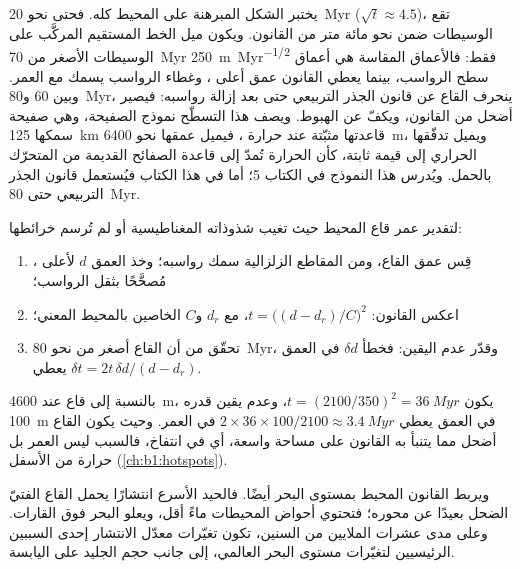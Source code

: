 يختبر الشكل المبرهنة على المحيط كله. فحتى نحو \qty{20}{Myr} ($\sqrt t \approx 4.5$)، تقع الوسيطات ضمن نحو مائة متر من القانون. ويكون ميل الخط المستقيم المركَّب على الوسيطات الأصغر من \qty{70}{Myr} \qty{250}{m.Myr^{-1/2}} فقط: فالأعماق المقاسة هي أعماق سطح الرواسب، بينما يعطي القانون عمق أعلى ، وغطاء الرواسب يسمك مع العمر. وبين 60 و\qty{80}{Myr}، ينحرف القاع عن قانون الجذر التربيعي حتى بعد إزالة رواسبه: فيصير أضحل من القانون، ويكفّ عن الهبوط. ويصف هذا التسطّح نموذج الصفيحة، وهي صفيحة سمكها \qty{125}{km} قاعدتها مثبّتة عند حرارة ، فيميل عمقها نحو \qty{6400}{m}، ويميل تدفّقها الحراري إلى قيمة ثابتة، كأن الحرارة تُمدّ إلى قاعدة الصفائح القديمة من  المتحرّك بالحمل. ويُدرس هذا النموذج في الكتاب 5؛ أما في هذا الكتاب فيُستعمل قانون الجذر التربيعي حتى \qty{80}{Myr}.

\begin{method}\label{met:b1:rifts-ridges-margins:age-from-depth}
لتقدير عمر قاع المحيط حيث تغيب شذوذاته المغناطيسية أو لم تُرسم خرائطها:
\begin{enumerate}
  \item قِس عمق القاع، ومن المقاطع الزلزالية سمك رواسبه؛ وخذ العمق $d$ لأعلى ، مُصحَّحًا بثقل الرواسب؛
  \item اعكس القانون: $t = \bigl((d - d_r)/C\bigr)^2$، مع $d_r$ و$C$ الخاصين بالمحيط المعني؛
  \item تحقّق من أن القاع أصغر من نحو \qty{80}{Myr}، وقدّر عدم اليقين: فخطأ $\delta d$ في العمق يعطي $\delta t = 2t\,\delta d/(d - d_r)$.
\end{enumerate}
\end{method}

بالنسبة إلى قاع عند \qty{4600}{m}، يكون $t = (2100/350)^2 = \qty{36}{Myr}$، وعدم يقين قدره \qty{100}{m} في العمق يعطي $2\times36\times100/2100 \approx
\qty{3.4}{Myr}$ في العمر. وحيث يكون القاع أضحل مما يتنبأ به القانون على مساحة واسعة، أي في انتفاخ، فالسبب ليس العمر بل حرارة من الأسفل (\cref{ch:b1:hotspots}).

ويربط القانون المحيط بمستوى البحر أيضًا. فالحيد الأسرع انتشارًا يحمل القاع الفتيّ الضحل بعيدًا عن محوره؛ فتحتوي أحواض المحيطات ماءً أقل، ويعلو البحر فوق القارات. وعلى مدى عشرات الملايين من السنين، تكون تغيّرات معدّل الانتشار إحدى السببين الرئيسيين لتغيّرات مستوى البحر العالمي، إلى جانب حجم الجليد على اليابسة.

